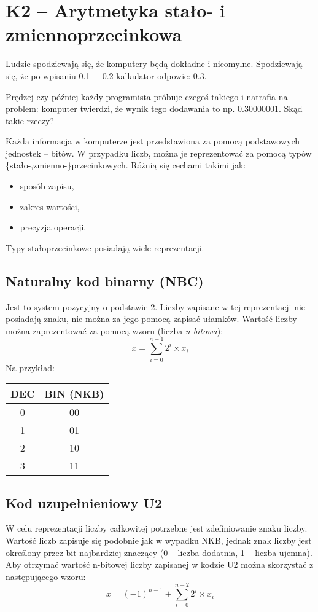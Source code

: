 \sloppy\section{K2 -- Arytmetyka stało- i zmiennoprzecinkowa}

Ludzie spodziewają się, że komputery będą dokładne i nieomylne.
Spodziewają się, że po wpisaniu 0.1 + 0.2 kalkulator odpowie: 0.3.

Prędzej czy później każdy programista próbuje czegoś takiego i natrafia na problem: komputer twierdzi, że wynik tego dodawania to np. 0.30000001.
Skąd takie rzeczy?


Każda informacja w komputerze jest przedstawiona za pomocą podstawowych jednostek -- bitów. W przypadku liczb, można je reprezentować za pomocą typów \{stało-,zmienno-\}przecinkowych. Różnią się cechami takimi jak:
\begin{itemize}
\item sposób zapisu,
\item zakres wartości,
\item precyzja operacji.
\end{itemize}

Typy stałoprzecinkowe posiadają wiele reprezentacji. 

\subsection{Naturalny kod binarny (NBC)}
Jest to system pozycyjny o podstawie 2. Liczby zapisane w tej reprezentacji nie posiadają znaku, nie można za jego pomocą zapisać ułamków. Wartość liczby można zaprezentować za pomocą wzoru (liczba \textit{n-bitowa}):
\begin{equation}
x = \sum_{i=0}^{n-1}2^{i} \times x_{i}
\end{equation}
Na przykład:
\begin{table}[H]
\centering
\begin{tabular}{|c|c|} \hline
DEC	&	BIN (NKB)	\\ \hline
0	&	00	\\ \hline
1	&	01	\\ \hline
2	&	10	\\ \hline
3	&	11	\\ \hline
\end{tabular}
\end{table}

\subsection{Kod uzupełnieniowy U2}
W celu reprezentacji liczby całkowitej potrzebne jest zdefiniowanie znaku liczby. Wartość liczb zapisuje się podobnie jak w wypadku NKB, jednak znak liczby jest określony przez bit najbardziej znaczący (0 -- liczba dodatnia, 1 -- liczba ujemna).
Aby otrzymać wartość n-bitowej liczby zapisanej w kodzie U2 można skorzystać z następującego wzoru:
\begin{equation}
x = (-1)^{n-1}+\sum_{i=0}^{n-2}2^{i} \times x_{i}
\end{equation}

